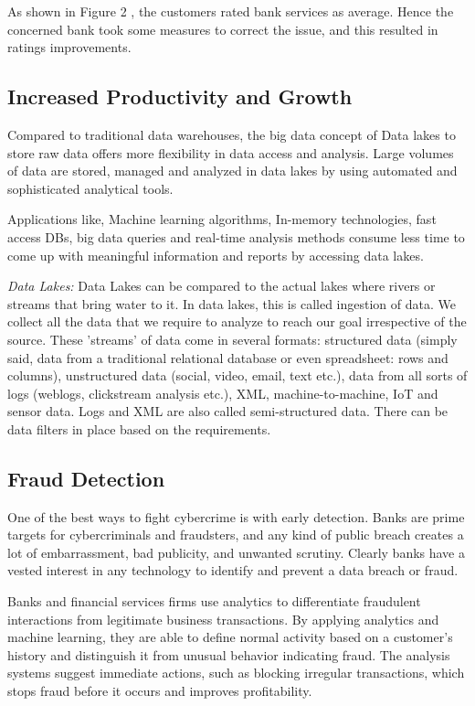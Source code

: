 \documentclass[sigconf]{acmart}
\begin{document}
As shown in Figure 2 , the customers rated bank services as average. Hence the concerned bank took some measures to correct the issue, and this resulted in ratings improvements.

\subsection{Increased Productivity and Growth}
Compared to traditional data warehouses, the big data concept of Data lakes to store raw data offers more flexibility in data access and analysis. Large volumes of data are stored, managed and analyzed in data lakes  by using automated and sophisticated analytical tools. 

Applications like, Machine learning algorithms, In-memory technologies, fast access DBs, big data queries and real-time analysis methods consume less time to come up with meaningful information and reports by accessing data lakes.

\textit{Data Lakes:} Data Lakes can be compared to the actual lakes where rivers or streams that bring water to it. In data lakes, this is called ingestion of data. We collect all the data that we require to analyze to reach our goal irrespective of the source. These 'streams' of data come in several formats: structured data (simply said, data from a traditional relational database or even spreadsheet: rows and columns), unstructured data (social, video, email, text etc.), data from all sorts of logs (weblogs, clickstream analysis etc.), XML, machine-to-machine, IoT and sensor data. Logs and XML are also called semi-structured data. There can be data filters in place based on the requirements\cite{data-lakes}.

\subsection{Fraud Detection}
One of the best ways to fight cybercrime is with early detection. Banks are prime targets for cybercriminals and fraudsters, and any kind of public breach creates a lot of embarrassment, bad publicity, and unwanted scrutiny. Clearly banks have a vested interest in any technology to identify and prevent a data breach or fraud\cite{the-top-5-trends-for-big-data-in-financial-services}.

Banks and financial services firms use analytics to differentiate fraudulent interactions from legitimate business transactions. By applying analytics and machine learning, they are able to define normal activity based on a customer's history and distinguish it from unusual behavior indicating fraud. The analysis systems suggest immediate actions, such as blocking irregular transactions, which stops fraud before it occurs and improves profitability\cite{5-big-data-use-cases-in-banking-and-financial-services}.
\end{document}
